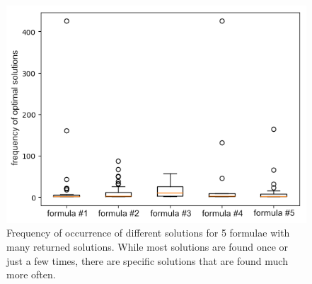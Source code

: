 \begin{figure}
\centering
\includegraphics[width=.7\textwidth]{../material_2/25_clauses__4_2_def_MISBIAS.png}
\caption{Frequency of occurrence of different solutions for 5 formulae with many returned solutions. While most solutions are found once or just a few times, there are specific solutions that are found much more often.} \label{fig:distr-sols}
\end{figure}


